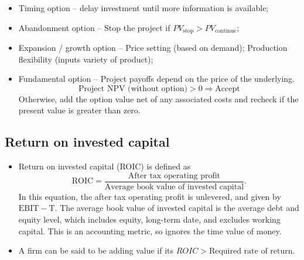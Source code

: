 \documentclass[../notes_compiled.tex]{subfiles}
\begin{document}
\begin{itemize}
\begin{itemize}
\item Timing option -- delay investment until more information is available;
\item Abandonment option -- Stop the project if $PV_{\text{stop}}>PV_{\text{continue}}$;
\item Expansion / growth option -- Price setting (based on demand); Production flexibility (inputs variety of product);
\item Fundamental option -- Project payoffs depend on the price of the underlying.
\begin{equation*}
\text{Project NPV (without option)} >0\Rightarrow\text{Accept}
\end{equation*}
Otherwise, add the option value net of any associated costs and recheck if the present value is greater than zero.
\end{itemize}
\end{itemize}

\subsection{Return on invested capital}
\begin{itemize}
\item Return on invested capital (ROIC) is defined as
\begin{equation}
\mathrm{ROIC} = \frac{\text{After tax operating profit}}{\text{Average book value of invested capital}}.
\end{equation}
In this equation, the after tax operating profit is unlevered, and given by $\mathrm{EBIT}-\mathrm{T}$. The average book value of invested capital is the average debt and equity level, which includes equity, long-term date, and excludes working capital. This is an accounting metric, so ignores the time value of money.
\item A firm can be said to be adding value if its $ROIC>\text{Required rate of return}$.
\end{itemize}
\end{document}
